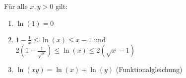 Für alle $x, y > 0$ gilt:
\begin{enumerate}[label=\alph*)]
    \item $\ln(1) = 0$
    \item $1-\frac{1}{x} \leq \ln(x) \leq x-1$ und \\
    $2(1-\frac{1}{\sqrt{x}}) \leq \ln(x) \leq 2 (\sqrt{x} - 1)$
    \item $\ln(xy) = \ln(x) + \ln(y)$ (Funktionalgleichung)
\end{enumerate}